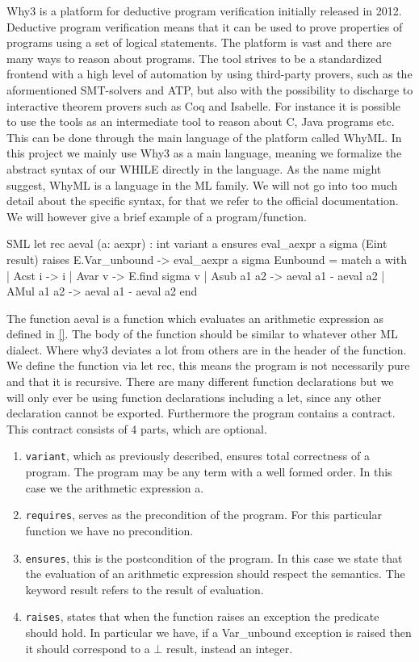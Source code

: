 Why3 is a platform for deductive program verification initially released in 2012. Deductive program verification means that it can be used to prove properties of programs using a set of logical statements. The platform is vast and there are many ways to reason about programs.
The tool strives to be a standardized frontend with a high level of automation by using third-party provers, such as the aformentioned SMT-solvers and ATP, but also with the possibility to discharge to interactive theorem provers such as Coq and Isabelle.
For instance it is possible to use the tools as an intermediate tool to reason about C, Java programs etc. This can be done through the main language of the platform called WhyML.
In this project we mainly use Why3 as a main language, meaning we formalize the abstract syntax of our WHILE directly in the language. As the name might suggest, WhyML is a language in the ML family.
We will not go into too much detail about the specific syntax, for that we refer to the official documentation. We will however give a brief example of a program/function.

\begin{lstlistings}{SML}
    let rec aeval (a: aexpr) : int
    variant { a }
    ensures { eval_aexpr a sigma (Eint result) }
    raises { E.Var_unbound -> eval_aexpr a sigma Eunbound }
  = match a with
    | Acst i -> i
    | Avar v ->  E.find sigma v
    | Asub a1 a2 -> aeval a1 - aeval a2
    | AMul a1 a2 -> aeval a1 - aeval a2
  end
\end{lstlistings}

The function aeval is a function which evaluates an arithmetic expression as defined in \autoref{}. The body of the function should be similar to whatever other ML dialect. Where why3 deviates a lot from others are in the header of the function. We define the function via let rec, this means the program is not necessarily pure and that it is recursive. There are many different function declarations but we will only ever be using function declarations including a let, since any other declaration cannot be exported.
Furthermore the program contains a contract. This contract consists of 4 parts, which are optional.

\begin{enumerate}
  \item \texttt{variant}, which as previously described, ensures total correctness of a program. The program may be any term with a well formed order. In this case we the arithmetic expression a.
  \item \texttt{requires}, serves as the precondition of the program. For this particular function we have no precondition.
  \item \texttt{ensures}, this is the postcondition of the program. In this case we state that the evaluation of an arithmetic expression should respect the semantics. The keyword result refers to the result of evaluation.
  \item \texttt{raises}, states that when the function raises an exception the predicate should hold. In particular we have, if a Var_unbound exception is raised then it should correspond to a $\bot$ result, instead an integer.
\end{enumerate}

